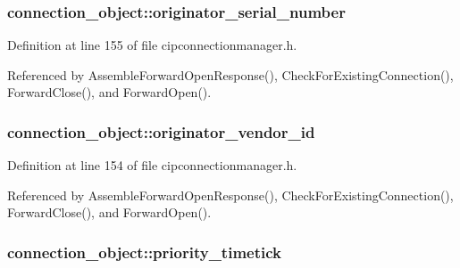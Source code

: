 \hypertarget{structconnection__object_a1844f588d73d20ba979908e40172ffbf}{
\subsubsection[{originator\-\_\-serial\-\_\-number}]{ {\bf connection\-\_\-object\-::originator\-\_\-serial\-\_\-number}}}\label{d1/d48/structconnection__object_a1844f588d73d20ba979908e40172ffbf}


\-Definition at line 155 of file cipconnectionmanager.\-h.



\-Referenced by \-Assemble\-Forward\-Open\-Response(), \-Check\-For\-Existing\-Connection(), \-Forward\-Close(), and \-Forward\-Open().

\hypertarget{structconnection__object_a84ec468763bc1ddbcba4d7162ea959ef}{
\subsubsection[{originator\-\_\-vendor\-\_\-id}]{ {\bf connection\-\_\-object\-::originator\-\_\-vendor\-\_\-id}}}\label{d1/d48/structconnection__object_a84ec468763bc1ddbcba4d7162ea959ef}


\-Definition at line 154 of file cipconnectionmanager.\-h.



\-Referenced by \-Assemble\-Forward\-Open\-Response(), \-Check\-For\-Existing\-Connection(), \-Forward\-Close(), and \-Forward\-Open().

\hypertarget{structconnection__object_a85777ec91a547bda197f4740c189d18f}{
\subsubsection[{priority\-\_\-timetick}]{ {\bf connection\-\_\-object\-::priority\-\_\-timetick}}}\label{d1/d48/structconnection__object_a85777ec91a547bda197f4740c189d18f}


